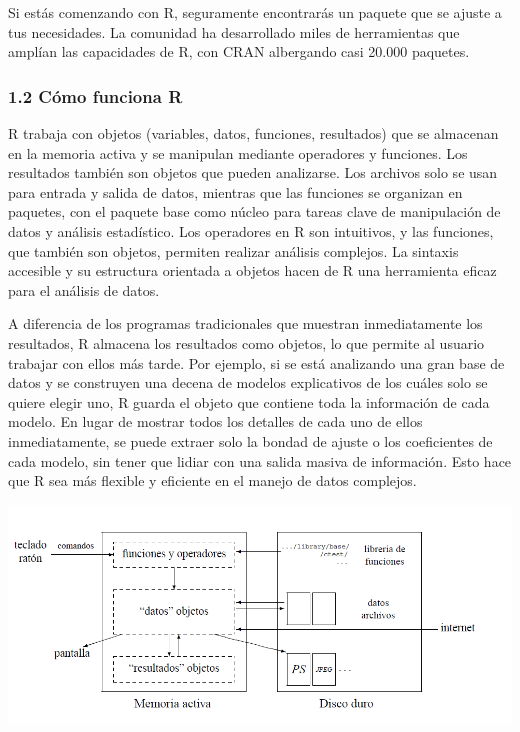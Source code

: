 \documentclass[
  letterpaper,
  DIV=11,
  numbers=noendperiod]{scrartcl}
\begin{document}
Si estás comenzando con R, seguramente encontrarás un paquete que se
ajuste a tus necesidades. La comunidad ha desarrollado miles de
herramientas que amplían las capacidades de R, con CRAN albergando casi
20.000 paquetes.

\hypertarget{cuxf3mo-funciona-r}{%
\subsubsection{1.2 Cómo funciona R}\label{cuxf3mo-funciona-r}}

R trabaja con objetos (variables, datos, funciones, resultados) que se
almacenan en la memoria activa y se manipulan mediante operadores y
funciones. Los resultados también son objetos que pueden analizarse. Los
archivos solo se usan para entrada y salida de datos, mientras que las
funciones se organizan en paquetes, con el paquete base como núcleo para
tareas clave de manipulación de datos y análisis estadístico. Los
operadores en R son intuitivos, y las funciones, que también son
objetos, permiten realizar análisis complejos. La sintaxis accesible y
su estructura orientada a objetos hacen de R una herramienta eficaz para
el análisis de datos.

A diferencia de los programas tradicionales que muestran inmediatamente
los resultados, R almacena los resultados como objetos, lo que permite
al usuario trabajar con ellos más tarde. Por ejemplo, si se está
analizando una gran base de datos y se construyen una decena de modelos
explicativos de los cuáles solo se quiere elegir uno, R guarda el objeto
que contiene toda la información de cada modelo. En lugar de mostrar
todos los detalles de cada uno de ellos inmediatamente, se puede extraer
solo la bondad de ajuste o los coeficientes de cada modelo, sin tener
que lidiar con una salida masiva de información. Esto hace que R sea más
flexible y eficiente en el manejo de datos complejos.

\includegraphics{images/clipboard-988688670.png}
\end{document}
